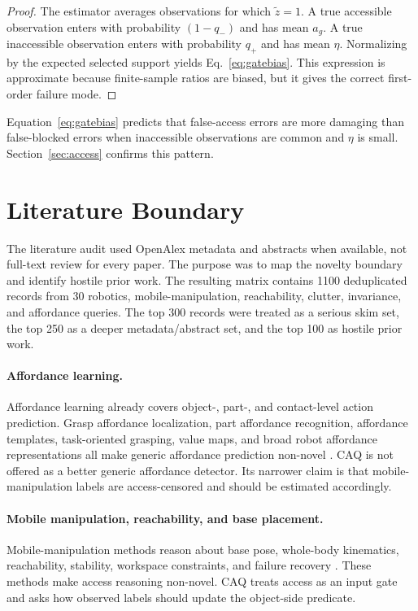 \documentclass{article}
\newcommand{\gate}{z}
\newcommand{\aff}{a}
\begin{document}
\begin{proof}
The estimator averages observations for which $\tilde{\gate}=1$. A true accessible observation enters with probability $(1-q_-)$ and has mean $\aff_g$. A true inaccessible observation enters with probability $q_+$ and has mean $\eta$. Normalizing by the expected selected support yields Eq.~\ref{eq:gatebias}. This expression is approximate because finite-sample ratios are biased, but it gives the correct first-order failure mode.
\end{proof}

Equation~\ref{eq:gatebias} predicts that false-access errors are more damaging than false-blocked errors when inaccessible observations are common and $\eta$ is small. Section~\ref{sec:access} confirms this pattern.

\section{Literature Boundary}

The literature audit used OpenAlex metadata and abstracts when available, not full-text review for every paper. The purpose was to map the novelty boundary and identify hostile prior work. The resulting matrix contains 1100 deduplicated records from 30 robotics, mobile-manipulation, reachability, clutter, invariance, and affordance queries. The top 300 records were treated as a serious skim set, the top 250 as a deeper metadata/abstract set, and the top 100 as hostile prior work.

\paragraph{Affordance learning.}
Affordance learning already covers object-, part-, and contact-level action prediction. Grasp affordance localization, part affordance recognition, affordance templates, task-oriented grasping, value maps, and broad robot affordance representations all make generic affordance prediction non-novel \citep{rw002,rw004,rw006,rw011,rw012,rw013,rw018,rw020,rw021,rw023,rw024,rw033,rw034,rw041,rw042,rw050,rw054,rw055,rw060,rw064,rw067,rw073,rw077,rw080}. CAQ is not offered as a better generic affordance detector. Its narrower claim is that mobile-manipulation labels are access-censored and should be estimated accordingly.

\paragraph{Mobile manipulation, reachability, and base placement.}
Mobile-manipulation methods reason about base pose, whole-body kinematics, reachability, stability, workspace constraints, and failure recovery \citep{rw001,rw003,rw007,rw008,rw015,rw019,rw022,rw026,rw027,rw029,rw030,rw032,rw043,rw044,rw045,rw052,rw056,rw057,rw058,rw065,rw066,rw071,rw074,rw075,rw076}. These methods make access reasoning non-novel. CAQ treats access as an input gate and asks how observed labels should update the object-side predicate.
\end{document}
